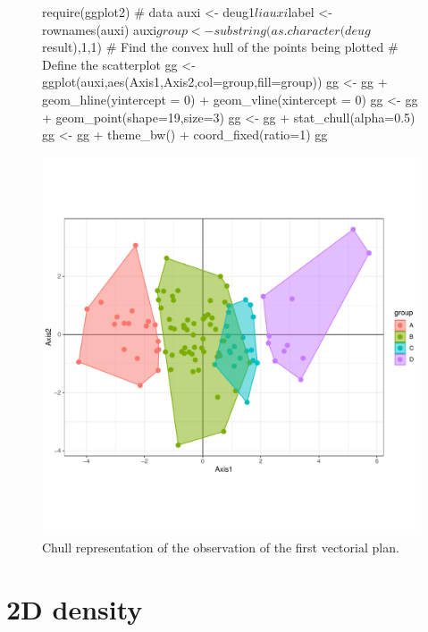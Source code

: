 \documentclass[a4paper,10pt]{article}
\begin{document}
\begin{figure}[H]
\begin{center}
\begin{Schunk}
\begin{Sinput}
  require(ggplot2)
  # data 
  auxi <- deug1$li
  auxi$label <- rownames(auxi)
  auxi$group <- substring(as.character(deug$result),1,1)
  # Find the convex hull of the points being plotted
  # Define the scatterplot
  gg <- ggplot(auxi,aes(Axis1,Axis2,col=group,fill=group))
  gg <- gg + geom_hline(yintercept = 0) + geom_vline(xintercept = 0)
  gg <- gg + geom_point(shape=19,size=3)
  gg <- gg + stat_chull(alpha=0.5)
  gg <-  gg + theme_bw() + coord_fixed(ratio=1)
  gg
\end{Sinput}
\end{Schunk}
\includegraphics{figs/sweave-lichull1}
\caption{Chull representation of the observation of the first vectorial plan.}
\label{fig:lichull1}
\end{center}
\end{figure}



\section{2D density}
\end{document}
